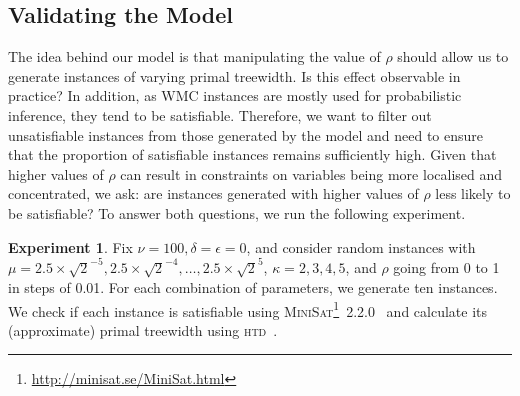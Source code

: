 \documentclass[letterpaper]{article} %
\theoremstyle{definition}
\newtheorem{experiment}{Experiment}
\theoremstyle{remark}
\newtheorem*{remark}{Remark}
\begin{document}




\subsection{Validating the Model}\label{sec:remarks}

The idea behind our model is that manipulating the value of $\rho$ should allow
us to generate instances of varying primal treewidth. Is this effect observable
in practice? In addition, as \textsf{WMC} instances are mostly used for
probabilistic inference, they tend to be satisfiable. Therefore, we want to
filter out unsatisfiable instances from those generated by the model and need to
ensure that the proportion of satisfiable instances remains sufficiently high.
Given that higher values of $\rho$ can result in constraints on variables being
more localised and concentrated, we ask: are instances generated with higher
values of $\rho$ less likely to be satisfiable? To answer both questions, we run
the following experiment.

\begin{experiment}\label{exp:regular_satisfiability}
  Fix $\nu = 100, \delta = \epsilon = 0$, and consider random instances with
  $\mu = 2.5 \times \sqrt{2}^{-5}, 2.5 \times \sqrt{2}^{-4}, \dots, 2.5 \times
  \sqrt{2}^5$, $\kappa = 2, 3, 4, 5$, and $\rho$ going from 0 to 1 in steps of
  0.01. For each combination of parameters, we generate ten instances. We check
  if each instance is satisfiable using
  \textsc{MiniSat}\footnote{\url{http://minisat.se/MiniSat.html}}~2.2.0~\cite{DBLP:conf/sat/EenS03}
  and calculate its (approximate) primal treewidth using
  \textsc{htd}~\cite{DBLP:conf/cpaior/AbseherMW17}.
\end{experiment}
\end{document}
